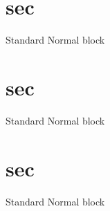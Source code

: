 \documentclass{beamer}
\begin{document}
	\section{sec }
	\begin{frame}{1}
		\begin{block}{Standard}
		  Normal block
		\end{block}
	\end{frame}


	\section{sec }
	\begin{frame}{2}
		\begin{block}{Standard}
		  Normal block
		\end{block}
	\end{frame}


	\section{sec }
	\begin{frame}{3}
		\begin{block}{Standard}
		  Normal block
		\end{block}
	\end{frame}
\end{document}
